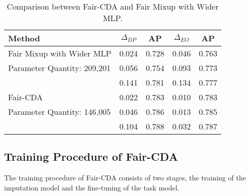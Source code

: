 \begin{table}[t]
    \centering
    \caption{Comparison between Fair-CDA and Fair Mixup with Wider MLP.}
    \label{table:para_ablation_2}
	\begin{adjustbox}{max width=0.47\textwidth}
        \begin{tabular}{lcccc}
        \hline
        \hline
        Method & $\Delta_{DP}$ & AP& $\Delta_{EO}$ &AP  \\
        \hline
        Fair Mixup with Wider MLP    & 0.024  &	0.728  & 0.046  & 0.763\\
        Parameter Quantity: 209,201  & 0.056  &	0.754  & 0.093  & 0.773\\
                                     & 0.141  &	0.781  & 0.134  & 0.777\\
        \hline
        Fair-CDA  & 0.022	& 0.783	  & 0.010   & 0.783 \\
        Parameter Quantity: 146,005   & 0.046   & 0.786   & 0.013   & 0.785\\
                  & 0.104	& 0.788	  & 0.032   & 0.787\\
        \hline
        \hline
        \end{tabular}
    \end{adjustbox}
    \vspace{-5pt}
\end{table}


\subsection{Training Procedure of Fair-CDA}

The training procedure of Fair-CDA consists of two stages, the training of the imputation model and the fine-tuning of the task model. 

